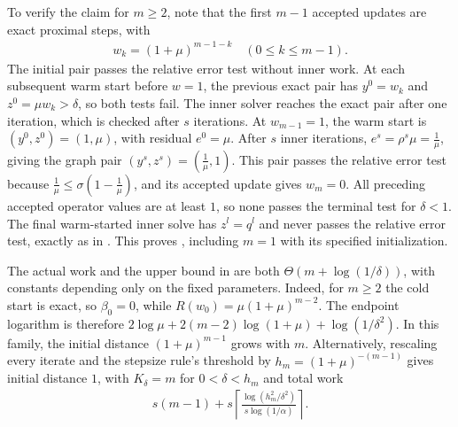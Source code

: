 \documentclass[11pt]{article}
\begin{document}
\begin{remark}
    To verify the claim for $m\geq2$, note that the first $m-1$ accepted updates are exact proximal steps, with
    \begin{align}
        w_k=(1+\mu)^{m-1-k}\quad(0\leq k\leq m-1).
    \end{align}
    The initial pair passes the relative error test without inner work.
    At each subsequent warm start before $w=1$, the previous exact pair has $y^0=w_k$ and $z^0=\mu w_k>\delta$, so both tests fail.
    The inner solver reaches the exact pair after one iteration, which is checked after $s$ iterations.
    At $w_{m-1}=1$, the warm start is $(y^0,z^0)=(1,\mu)$, with residual $e^0=\mu$.
    After $s$ inner iterations, $e^s=\rho^s\mu=\frac{1}{\mu}$, giving the graph pair $(y^s,z^s)=(\frac{1}{\mu},1)$.
    This pair passes the relative error test because $\frac{1}{\mu}\leq\sigma(1-\frac{1}{\mu})$, and its accepted update gives $w_m=0$.
    All preceding accepted operator values are at least $1$, so none passes the terminal test for $\delta<1$.
    The final warm-started inner solve has $z^l=q^l$ and never passes the relative error test, exactly as in .
    This proves , including $m=1$ with its specified initialization.

    The actual work and the upper bound in  are both $\Theta(m+\log(1/\delta))$, with constants depending only on the fixed parameters.
    Indeed, for $m\geq2$ the cold start is exact, so $\beta_0=0$, while $R(w_0)=\mu(1+\mu)^{m-2}$.
    The endpoint logarithm is therefore $2\log\mu+2(m-2)\log(1+\mu)+\log(1/\delta^2)$.
    In this family, the initial distance $(1+\mu)^{m-1}$ grows with $m$.
    Alternatively, rescaling every iterate and the stepsize rule's threshold by $h_m=(1+\mu)^{-(m-1)}$ gives initial distance $1$, with $K_\delta=m$ for $0<\delta<h_m$ and total work
    \begin{align}
        s(m-1)+s\left\lceil\frac{\log(h_m^2/\delta^2)}{s\log(1/\alpha)}\right\rceil.
    \end{align}
\end{remark}
\end{document}
